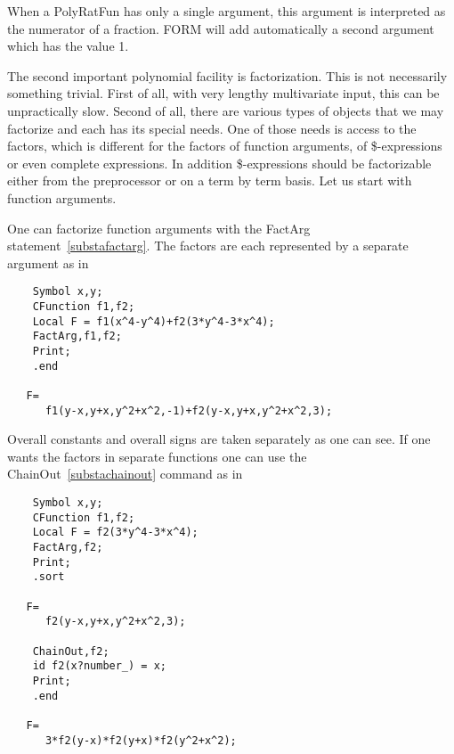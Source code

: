 \noindent When a PolyRatFun has only a single argument, this argument is 
interpreted as the numerator of a fraction. FORM will add automatically a 
second argument which has the value 1.

\noindent The second important polynomial facility is factorization. This 
is not necessarily something trivial. First of all, with very lengthy 
multivariate input, this can be unpractically slow. Second of all, there 
are various types of objects that we may factorize and each has its special 
needs. One of those needs is access to the factors, which is different for 
the factors of function arguments, of \$-expressions or even complete 
expressions. In addition \$-expressions should be factorizable either from 
the preprocessor or on a term by term basis. Let us start with function 
arguments.

\noindent One can factorize function arguments with the FactArg 
statement~\ref{substafactarg}. The factors are each represented by a 
separate argument as in
\begin{verbatim}
    Symbol x,y;
    CFunction f1,f2;
    Local F = f1(x^4-y^4)+f2(3*y^4-3*x^4);
    FactArg,f1,f2;
    Print;
    .end

   F=
      f1(y-x,y+x,y^2+x^2,-1)+f2(y-x,y+x,y^2+x^2,3);
\end{verbatim}
Overall constants and overall signs are taken separately as one can see. If 
one wants the factors in separate functions one can use the 
ChainOut~\ref{substachainout} command as in
\begin{verbatim}
    Symbol x,y;
    CFunction f1,f2;
    Local F = f2(3*y^4-3*x^4);
    FactArg,f2;
    Print;
    .sort

   F=
      f2(y-x,y+x,y^2+x^2,3);

    ChainOut,f2;
    id f2(x?number_) = x;
    Print;
    .end

   F=
      3*f2(y-x)*f2(y+x)*f2(y^2+x^2);
\end{verbatim}

